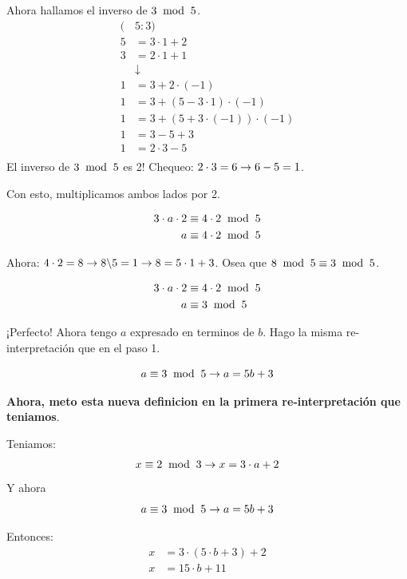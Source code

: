 \documentclass[12pt,a4paper]{report}
\begin{document}
Ahora hallamos el inverso de $3 \; \bmod \; {{5}}$.
$$
\begin{aligned}
  (&5 : 3)\\
  5 &= 3 \cdot 1 + 2 \\
  3 &= 2 \cdot 1 + 1 \\
  &\downarrow \\
1 &= 3 + 2 \cdot (-1)  \\
1 &= 3 + (5 - 3 \cdot 1) \cdot (-1)  \\
1 &= 3 + (5 + 3 \cdot (-1)) \cdot (-1)  \\
1 &= 3 - 5 + 3 \\
1 &= 2 \cdot 3 - 5 \\
\end{aligned}
$$
El inverso de $3 \; \bmod \; {{5}}$ es 2! Chequeo: $ 2 \cdot 3 = 6 \rightarrow 6 - 5 = 1$.

Con esto, multiplicamos ambos lados por 2.
 
$$
\begin{aligned}
3 \cdot a \cdot 2 &\equiv 4 \cdot 2 \; \bmod \; {{5}} \\
a &\equiv 4 \cdot 2 \; \bmod \; {{5}} \\
\end{aligned}
$$

Ahora: $4 \cdot 2 = 8 \rightarrow 8 \backslash 5 = 1 \rightarrow 8 = 5 \cdot 1 + 3$. Osea que $8 \; \bmod \; {{5}} \equiv 3 \; \bmod \; {{5}}$.

$$
\begin{aligned}
3 \cdot a \cdot 2 &\equiv 4 \cdot 2 \; \bmod \; {{5}} \\
a &\equiv 3 \; \bmod \; {{5}} \\
\end{aligned}
$$

¡Perfecto! Ahora tengo $a$ expresado en terminos de $b$. Hago la misma re-interpretación que en el paso 1.

$$
a \equiv 3 \; \bmod \; {{5}}  \rightarrow a = 5b + 3
$$

\textbf{Ahora, meto esta nueva definicion en la primera re-interpretación que teniamos}.

Teniamos:
$$
\begin{aligned}
x &\equiv 2 \; \bmod \; {{3}} \rightarrow x = 3 \cdot a + 2 \\
\end{aligned}
$$
Y ahora
$$
a \equiv 3 \; \bmod \; {{5}}  \rightarrow a = 5b + 3
$$

Entonces:
$$
\begin{aligned}
x &= 3 \cdot (5 \cdot b + 3) + 2 \\
x &= 15 \cdot b + 11 \\
\end{aligned}
$$
\end{document}
